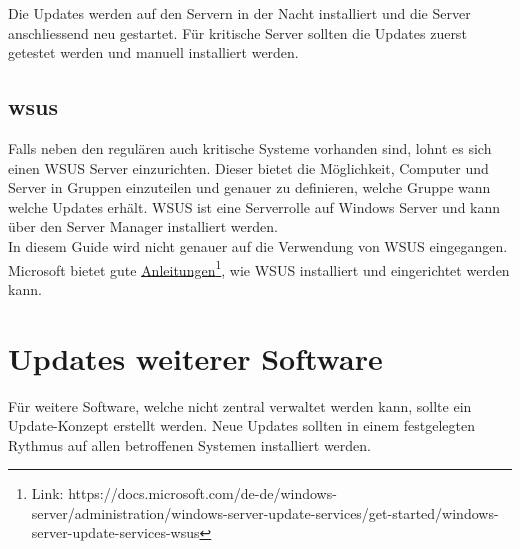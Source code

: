 Die Updates werden auf den Servern in der Nacht installiert und die Server anschliessend neu gestartet.
Für kritische Server sollten die Updates zuerst getestet werden und manuell installiert werden.

\subsection{\acrfull{wsus}}\label{subsec:wsus}
Falls neben den regulären auch kritische Systeme vorhanden sind, lohnt es sich einen WSUS Server einzurichten.
Dieser bietet die Möglichkeit, Computer und Server in Gruppen einzuteilen und genauer zu definieren, welche Gruppe wann welche Updates erhält.
WSUS ist eine Serverrolle auf Windows Server und kann über den Server Manager installiert werden.\\

In diesem Guide wird nicht genauer auf die Verwendung von WSUS eingegangen.
Microsoft bietet gute \href{https://docs.microsoft.com/de-de/windows-server/administration/windows-server-update-services/get-started/windows-server-update-services-wsus}{Anleitungen}\footnote{Link: https://docs.microsoft.com/de-de/windows-server/administration/windows-server-update-services/get-started/windows-server-update-services-wsus}, wie WSUS installiert und eingerichtet werden kann.


\section{Updates weiterer Software}
Für weitere Software, welche nicht zentral verwaltet werden kann, sollte ein Update-Konzept erstellt werden.
Neue Updates sollten in einem festgelegten Rythmus auf allen betroffenen Systemen installiert werden.